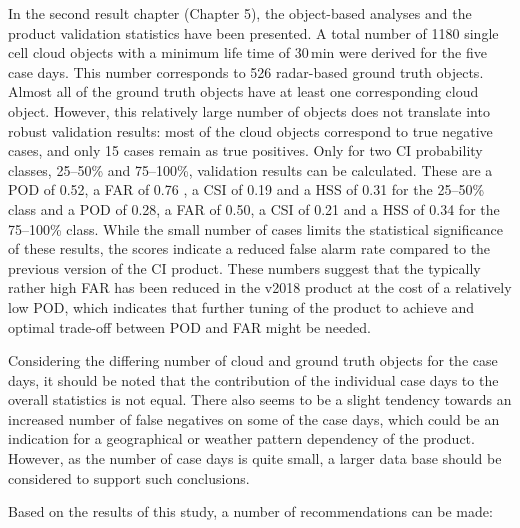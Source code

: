In the second result chapter (Chapter 5), the object-based analyses and the product validation statistics have been presented. A total number of 1180 single cell cloud objects with a minimum life time of 30\,min were derived for the five case days. This number corresponds to 526 radar-based ground truth objects. Almost all of the ground truth objects have at least one corresponding cloud object. However, this relatively large number of objects does not translate into robust validation results: most of the cloud objects correspond to true negative cases, and only 15 cases remain as true positives. Only for two CI probability classes, 25--50\% and 75--100\%, validation results can be calculated. These are a POD of 0.52, a FAR of 0.76 , a CSI of 0.19 and a HSS of 0.31 for the 25--50\% class and a POD of 0.28, a FAR of 0.50, a CSI of 0.21 and a HSS of 0.34 for the 75--100\% class. While the small number of cases limits the statistical significance of these results, the scores indicate a reduced false alarm rate compared to the previous version of the CI product.
These numbers suggest that the typically rather high FAR has been reduced in the v2018 product at the cost of a relatively low POD, which indicates that further tuning of the product to achieve and optimal trade-off between POD and FAR might be needed.

Considering the differing number of cloud and ground truth objects for the case days, it should be noted that the contribution of the individual case days to the overall statistics is not equal. There also seems to be a slight tendency towards an increased number of false negatives on some of the case days, which could be an indication for a geographical or weather pattern dependency of the product. However, as the number of case days is quite small, a larger data base should be considered to support such conclusions.


Based on the results of this study, a number of recommendations can be made: 

